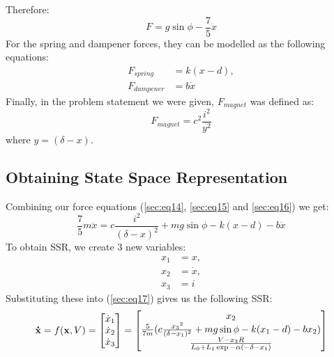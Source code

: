 \documentclass[a4paper,10pt,reqno]{amsart}
\numberwithin{equation}{section}
\begin{document}
Therefore:
\begin{equation}
\label{sec:eq14}
        F=g\sin{\phi}-\frac{7}{5}\ddot x
\end{equation}
For the spring and dampener forces, they can be modelled as the following equations:
\begin{subequations}
\label{sec:eq15}
\begin{align}
    F_{spring}&=k(x-d), \\
    F_{dampener}&=b\dot x
\end{align}
\end{subequations}
Finally, in the problem statement we were given, $F_{magnet}$ was defined as:
\begin{equation}
\label{sec:eq16}
    F_{magnet}=c^2\frac{i^2}{y^2}
\end{equation}
where $y=(\delta-x)$. 
\subsection{Obtaining State Space Representation} Combining our force equations (\ref{sec:eq14}, \ref{sec:eq15} and \ref{sec:eq16}) we get:
\begin{equation}
\label{sec:eq17}
    \frac{7}{5}m\ddot x=c\frac{i^2}{(\delta-x)^2}+mg\sin{\phi}-k(x-d)-b\dot x
\end{equation}
To obtain SSR, we create 3 new variables:
\begin{align*}
x_1&=x, \\
x_2&=\dot x, \\
x_3&=i
\end{align*}
Substituting these into (\ref{sec:eq17}) gives us the following SSR:
\begin{equation}
\label{sec:eq18}
    \bold{\dot x} = f(\bold x, V) = \begin{bmatrix} 
        \dot x_1 \\ 
        \dot x_2 \\ 
        \dot x_3 
    \end{bmatrix} = \begin{bmatrix}
        x_2 \\
        \frac{5}{7m}(c\frac{{x_3}^2}{(\delta-x_1)^2}+mg\sin{\phi}-k(x_1-d)-bx_2) \\
        \frac{V-x_3R}{L_0+L_1\exp{-\alpha(-\delta-x_1)}}
    \end{bmatrix}
\end{equation}
\end{document}
